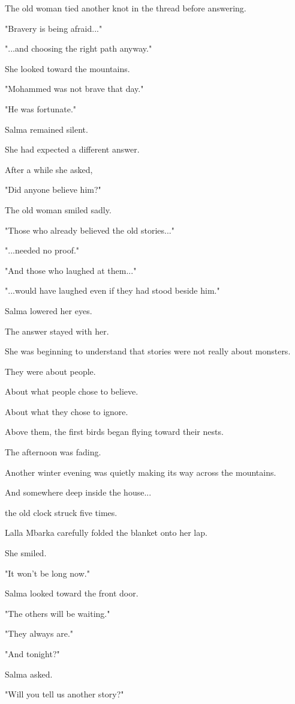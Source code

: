 \documentclass[12pt,openany]{book}
\begin{document}
The old woman tied another knot in the thread before answering.

"Bravery is being afraid..."

"...and choosing the right path anyway."

She looked toward the mountains.

"Mohammed was not brave that day."

"He was fortunate."

Salma remained silent.

She had expected a different answer.

After a while she asked,

"Did anyone believe him?"

The old woman smiled sadly.

"Those who already believed the old stories..."

"...needed no proof."

"And those who laughed at them..."

"...would have laughed even if they had stood beside him."

Salma lowered her eyes.

The answer stayed with her.

She was beginning to understand that stories were not really about monsters.

They were about people.

About what people chose to believe.

About what they chose to ignore.

Above them, the first birds began flying toward their nests.

The afternoon was fading.

Another winter evening was quietly making its way across the mountains.

And somewhere deep inside the house...

the old clock struck five times.

Lalla Mbarka carefully folded the blanket onto her lap.

She smiled.

"It won't be long now."

Salma looked toward the front door.

"The others will be waiting."

"They always are."

"And tonight?"

Salma asked.

"Will you tell us another story?"
\end{document}
